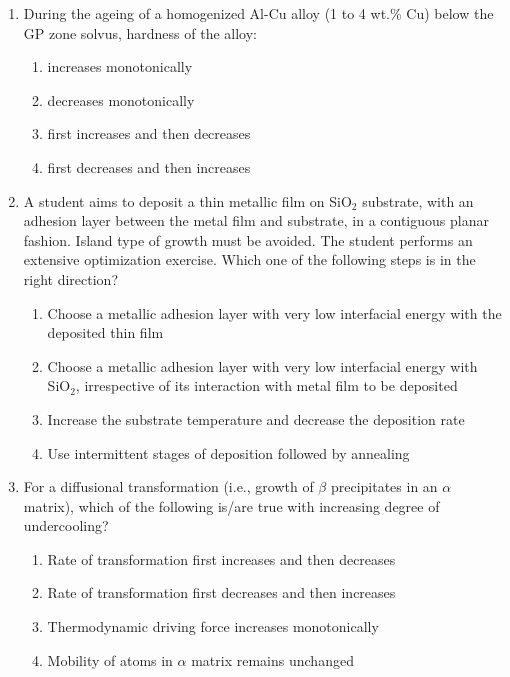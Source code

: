 \documentclass[a4paper,10pt]{article}
\begin{document}
\begin{enumerate}
\item During the ageing of a homogenized Al-Cu alloy (1 to 4 wt.\% Cu) below the GP zone solvus, hardness of the alloy:

\hfill{}
\begin{enumerate}
    \item increases monotonically
    \item decreases monotonically
    \item first increases and then decreases
    \item first decreases and then increases
\end{enumerate}

\item A student aims to deposit a thin metallic film on SiO$_2$ substrate, with an adhesion layer between the metal film and substrate, in a contiguous planar fashion. Island type of growth must be avoided. The student performs an extensive optimization exercise. Which one of the following steps is in the right direction?

\hfill{}
\begin{enumerate}
    \item Choose a metallic adhesion layer with very low interfacial energy with the deposited thin film
    \item Choose a metallic adhesion layer with very low interfacial energy with SiO$_2$, irrespective of its interaction with metal film to be deposited
    \item Increase the substrate temperature and decrease the deposition rate
    \item Use intermittent stages of deposition followed by annealing
\end{enumerate}

\item For a diffusional transformation (i.e., growth of $\beta$ precipitates in an $\alpha$ matrix), which of the following is/are true with increasing degree of undercooling?

\hfill{}
\begin{enumerate}
    \item Rate of transformation first increases and then decreases
    \item Rate of transformation first decreases and then increases
    \item Thermodynamic driving force increases monotonically
    \item Mobility of atoms in $\alpha$ matrix remains unchanged
\end{enumerate}


\end{enumerate}
\end{document}
